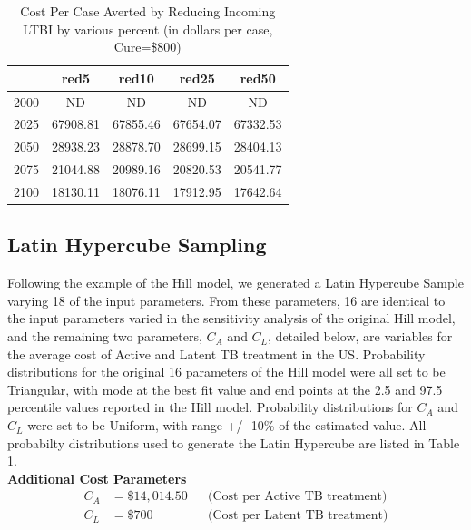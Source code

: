 \documentclass{amsart}
\begin{document}
\begin{table}
\centering
\begin{tabular}{|r|cccc|} \hline
       & red5     & red10    & red25    & red50    \\ \hline
  2000 & ND       & ND       & ND       & ND       \\ 
  2025 & 67908.81 & 67855.46 & 67654.07 & 67332.53 \\ 
  2050 & 28938.23 & 28878.70 & 28699.15 & 28404.13 \\ 
  2075 & 21044.88 & 20989.16 & 20820.53 & 20541.77 \\ 
  2100 & 18130.11 & 18076.11 & 17912.95 & 17642.64 \\ \hline
\end{tabular}
\caption{Cost Per Case Averted by Reducing Incoming LTBI by various percent (in
dollars per case, Cure=\$800)} 
\label{tab:cpcaRed}
\end{table}

\subsection{Latin Hypercube Sampling}
Following the example of the
Hill model, we generated a Latin Hypercube Sample varying 18 of the input
parameters.  From these parameters, 16 are identical to the input parameters
varied in the sensitivity analysis of the original Hill model, and the remaining
two parameters, $C_{A}$ and $C_{L}$, detailed below, are variables for the average cost of
Active and Latent TB treatment in the US.   Probability distributions for the
original 16 parameters of the Hill model were all set to be Triangular, with
mode at the best fit value and end points at the 2.5 and 97.5 percentile values
reported in the Hill model.  Probability distributions for $C_{A}$ and $C_{L}$
were set to be Uniform, with range +/- 10\% of the estimated value.  All
probabilty distributions used to generate the Latin Hypercube are listed in
Table 1.\\

{\bf Additional Cost Parameters}
\begin{align*}
  C_{A} &= \$14,014.50 &&\text{(Cost per Active TB treatment)}\\
  C_{L} &= \$700       &&\text{(Cost per Latent TB treatment)}
\end{align*}
\vspace{5mm}
\end{document}
